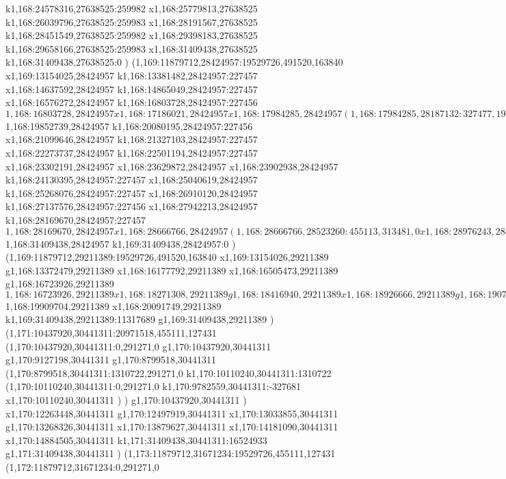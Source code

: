 {k1,168:24578316,27638525:259982
x1,168:25779813,27638525
k1,168:26039796,27638525:259983
x1,168:28191567,27638525
k1,168:28451549,27638525:259982
x1,168:29398183,27638525
k1,168:29658166,27638525:259983
x1,168:31409438,27638525
k1,168:31409438,27638525:0
)
(1,169:11879712,28424957:19529726,491520,163840
x1,169:13154025,28424957
k1,168:13381482,28424957:227457
x1,168:14637592,28424957
k1,168:14865049,28424957:227457
x1,168:16576272,28424957
k1,168:16803728,28424957:227456
$1,168:16803728,28424957
x1,168:17186021,28424957
x1,168:17984285,28424957
(1,168:17984285,28187132:327477,197518,0
x1,168:18225973,28187132
)
x1,168:18566625,28424957
k1,168:18763671,28424957:197046
x1,168:19273397,28424957
k1,168:19470444,28424957:197047
x1,168:19852739,28424957
$1,168:19852739,28424957
k1,168:20080195,28424957:227456
x1,168:21099646,28424957
k1,168:21327103,28424957:227457
x1,168:22273737,28424957
k1,168:22501194,28424957:227457
x1,168:23302191,28424957
x1,168:23629872,28424957
x1,168:23902938,28424957
k1,168:24130395,28424957:227457
x1,168:25040619,28424957
k1,168:25268076,28424957:227457
x1,168:26910120,28424957
k1,168:27137576,28424957:227456
x1,168:27942213,28424957
k1,168:28169670,28424957:227457
$1,168:28169670,28424957
x1,168:28666766,28424957
(1,168:28666766,28523260:455113,313481,0
x1,168:28976243,28523260
)
x1,168:29759037,28424957
k1,168:29910672,28424957:151635
x1,168:30420398,28424957
k1,168:30572032,28424957:151634
x1,168:31409438,28424957
$1,168:31409438,28424957
k1,169:31409438,28424957:0
)
(1,169:11879712,29211389:19529726,491520,163840
x1,169:13154026,29211389
g1,168:13372479,29211389
x1,168:16177792,29211389
x1,168:16505473,29211389
g1,168:16723926,29211389
$1,168:16723926,29211389
x1,168:18271308,29211389
g1,168:18416940,29211389
x1,168:18926666,29211389
g1,168:19072298,29211389
x1,168:19909704,29211389
$1,168:19909704,29211389
x1,168:20091749,29211389
k1,169:31409438,29211389:11317689
g1,169:31409438,29211389
)
(1,171:10437920,30441311:20971518,455111,127431
(1,170:10437920,30441311:0,291271,0
g1,170:10437920,30441311
g1,170:9127198,30441311
g1,170:8799518,30441311
(1,170:8799518,30441311:1310722,291271,0
k1,170:10110240,30441311:1310722
(1,170:10110240,30441311:0,291271,0
k1,170:9782559,30441311:-327681
x1,170:10110240,30441311
)
)
g1,170:10437920,30441311
)
x1,170:12263448,30441311
g1,170:12497919,30441311
x1,170:13033855,30441311
g1,170:13268326,30441311
x1,170:13879627,30441311
x1,170:14181090,30441311
x1,170:14884505,30441311
k1,171:31409438,30441311:16524933
g1,171:31409438,30441311
)
(1,173:11879712,31671234:19529726,455111,127431
(1,172:11879712,31671234:0,291271,0
}
